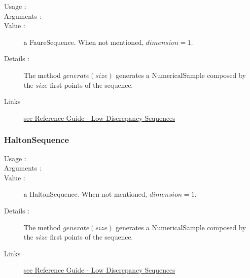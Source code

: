 \begin{description}

\item[Usage :] \rule{0pt}{1em}

\item[Arguments :]  \rule{0pt}{1em}

\item[Value :] a FaureSequence. When not mentioned, $dimension=1$.

\item[Details :]  The method $generate(size)$ generates a NumericalSample composed by the $size$ first points of the sequence.


\item[Links] \rule{0pt}{1em}
  \href{OpenTURNS_ReferenceGuide.pdf}{see Reference Guide - Low Discrepancy Sequences}
\end{description}




\newpage  \subsubsection{HaltonSequence}

\begin{description}

\item[Usage :] \rule{0pt}{1em}

\item[Arguments :]  \rule{0pt}{1em}

\item[Value :] a HaltonSequence. When not mentioned, $dimension=1$.

\item[Details :]  The method $generate(size)$ generates a NumericalSample composed by the $size$ first points of the sequence.


\item[Links] \rule{0pt}{1em}
  \href{OpenTURNS_ReferenceGuide.pdf}{see Reference Guide - Low Discrepancy Sequences}
\end{description}


